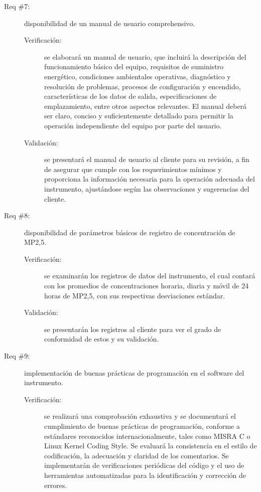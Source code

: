 \begin{description}
	\item [Req \#7:] disponibilidad de un manual de usuario comprehensivo.
	
	\begin{description}
		\item [Verificación:] se elaborará un manual de usuario, que incluirá la descripción del funcionamiento básico del equipo, requisitos de suministro energético, condiciones ambientales operativas, diagnóstico y resolución de problemas, procesos de configuración y encendido, características de los datos de salida, especificaciones de emplazamiento, entre otros aspectos relevantes. El manual deberá ser claro, conciso y suficientemente detallado para permitir la operación independiente del equipo por parte del usuario.
		\item [Validación:] se presentará el manual de usuario al cliente para su revisión, a fin de asegurar que cumple con los requerimientos mínimos y proporciona la información necesaria para la operación adecuada del instrumento, ajustándose según las observaciones y sugerencias del cliente.
	\end{description}
	
	\item [Req \#8:] disponibilidad de parámetros básicos de registro de concentración de MP2,5.
	
	\begin{description}
		\item [Verificación:] se examinarán los registros de datos del instrumento, el cual contará con los promedios de concentraciones horaria, diaria y móvil de 24 horas de MP2,5, con sus respectivas desviaciones estándar.
		
		\item [Validación:] se presentarán los registros al cliente para ver el grado de conformidad de estos y su validación.
	\end{description}
	
	\item [Req \#9:] implementación de buenas prácticas de programación en el software del instrumento.
	
	\begin{description}
		\item [Verificación:] se realizará una comprobación exhaustiva y se documentará el cumplimiento de buenas prácticas de programación, conforme a estándares reconocidos internacionalmente, tales como MISRA C o Linux Kernel Coding Style. Se evaluará la consistencia en el estilo de codificación, la adecuación y claridad de los comentarios. Se implementarán de verificaciones periódicas del código y el uso de herramientas automatizadas para la identificación y corrección de errores.
		

\end{description}
\end{description}
